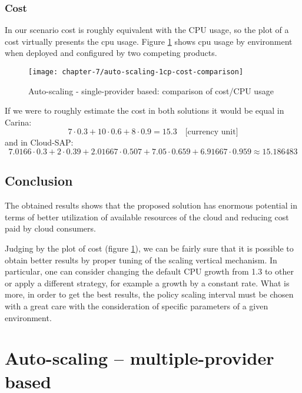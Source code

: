 \subsubsection*{Cost}
In our scenario cost is roughly equivalent with the CPU usage, so the plot of a cost virtually presents the cpu usage. Figure \ref{eval:auto-scaling-1cp-cost-comparison} shows cpu usage by environment when deployed and configured by two competing products.
\begin{figure}[!ht]
  \begin{center}
    \texttt{[image: chapter-7/auto-scaling-1cp-cost-comparison]}
  \end{center}
  \caption{Auto-scaling - single-provider based: comparison of cost/CPU usage}
  \label{eval:auto-scaling-1cp-cost-comparison}
\end{figure}
If we were to roughly estimate the cost in both solutions it would be equal in Carina:
\begin{equation}
  7\cdot 0.3 + 10\cdot 0.6 + 8\cdot 0.9 = 15.3 \quad \text{[currency unit]}
\end{equation}
and in Cloud-SAP:
\begin{equation}
  7.0166\cdot 0.3 + 2\cdot 0.39 + 2.01667\cdot0.507 + 7.05\cdot 0.659 + 6.91667\cdot 0.959 \approx 15.186483
\end{equation}

\subsection*{Conclusion}
The obtained results shows that the proposed solution has enormous potential in terms of better utilization of available resources of the cloud and reducing cost paid by cloud consumers.

Judging by the plot of cost (figure \ref{eval:auto-scaling-1cp-cost-comparison}), we can be fairly sure that it is possible to obtain better results by proper tuning of the scaling vertical mechanism. In particular, one can consider changing the default CPU growth from 1.3 to other or apply a different strategy, for example a growth by a constant rate. What is more, in order to get the best results, the policy scaling interval must be chosen with a great care with the consideration of specific parameters of a given environment.

\newpage
\section{Auto-scaling -- multiple-provider based}
